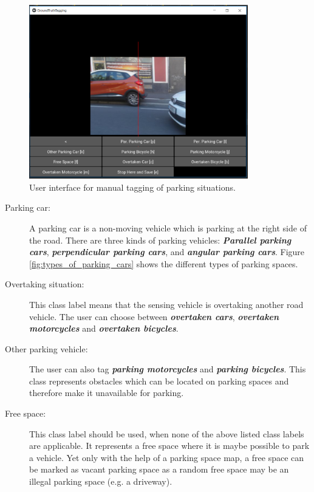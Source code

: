 \begin{figure}
	\centering
	\includegraphics[width=0.85\textwidth]{img/ground_truth_tagging_ui.PNG}
	\caption{User interface for manual tagging of parking situations.}
	\label{fig:ground_truth_tagging_ui}
\end{figure}

\begin{description}

\item[Parking car:] A parking car is a non-moving vehicle which is parking at the right side of the road. There are three kinds of parking vehicles: \textbf{\textit{Parallel parking cars}}, \textbf{\textit{perpendicular parking cars}}, and \textbf{\textit{angular parking cars}}. Figure \ref{fig:types_of_parking_cars} shows the different types of parking spaces.

\item[Overtaking situation:] This class label means that the sensing vehicle is overtaking another road vehicle. The user can choose between \textbf{\textit{overtaken cars}}, \textbf{\textit{overtaken motorcycles}} and \textbf{\textit{overtaken bicycles}}.

\item[Other parking vehicle:] The user can also tag \textbf{\textit{parking motorcycles}} and \textbf{\textit{parking bicycles}}. This class represents obstacles which can be located on parking spaces and therefore make it unavailable for parking.

\item[Free space:] This class label should be used, when none of the above listed class labels are applicable. It represents a free space where it is maybe possible to park a vehicle. Yet only with the help of a parking space map, a free space can be marked as vacant parking space as a random free space may be an illegal parking space (e.g. a driveway).

\end{description}



